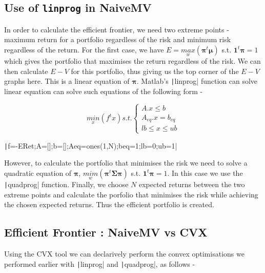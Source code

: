\documentclass[11pt]{article}
\begin{document}
\subsection{Use of \texttt{linprog} in NaiveMV}

In order to calculate the efficient frontier, we need two extreme points - maximum return for a 
portfolio regardless of the risk and minimum risk regardless of the return. For the first case, we have
$E = \underset{w}{max}(\bm{\pi}^t\bm{\mu})$ s.t. $\bm{1}^t\bm{\pi} = 1$ which gives the portfolio that 
maximises the return regardless of the risk. We can then calculate $E-V$ for this portfolio, thus giving
us the top corner of the $E-V$ graphs here. This is a linear equation of $\bm{\pi}$. Matlab's
\texttt|linprog| function can solve linear equation can solve such equations of the following form -

\begin{minipage}{.4\textwidth}
  	\[
		\underset{x}{min}(f^tx) s.t. 
	\begin{cases}
		A.x \leq b\\
		A_{eq}.x = b_{eq}\\
		lb \leq x \leq ub
	\end{cases}
	\]
\end{minipage}%
\begin{minipage}{.6\textwidth}
  	\texttt|f=-ERet;A=[];b=[];Aeq=ones(1,N);beq=1;lb=0;ub=1|
\end{minipage}

However, to calculate the portfolio that minimises the risk we need to solve a quadratic equation of 
$\bm{\pi}$, $\underset{w}{mim}(\bm{\pi}^t\bm{\Sigma}\bm{\pi})$ s.t. $\bm{1}^t\bm{\pi} = 1$. In this case we use the
\texttt|quadprog| function. Finally, we choose $N$ expected returns between the two extreme
points and calculate the porfolio that minimises the risk while achieving the chosen expected returns.
Thus the efficient portfolio is created.

\subsection{Efficient Frontier : NaiveMV vs CVX}

Using the CVX tool we can declarively perform the convex optimisations we performed earlier with
\texttt|linprog| and \texttt|quadprog|, as follows -
\end{document}
